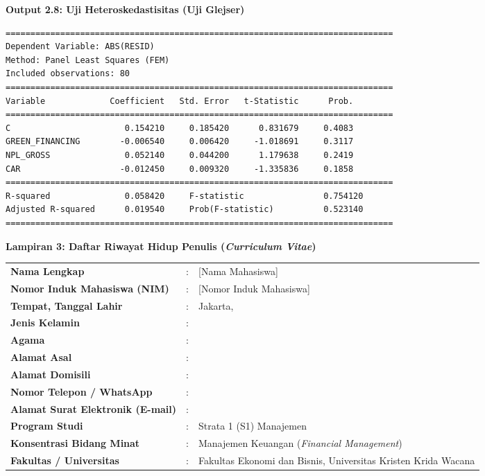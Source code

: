 \documentclass[12pt,a4paper]{article}
\newcommand{\nahamahasiswa}{[Nama Mahasiswa]}
\newcommand{\nim}{[Nomor Induk Mahasiswa]}
\numberwithin{equation}{section}
\begin{document}
\vspace{0.4cm}
\noindent \textbf{Output 2.8: Uji Heteroskedastisitas (Uji Glejser)}
\begin{verbatim}
==============================================================================
Dependent Variable: ABS(RESID)
Method: Panel Least Squares (FEM)
Included observations: 80
==============================================================================
Variable             Coefficient   Std. Error   t-Statistic      Prob.
==============================================================================
C                       0.154210     0.185420      0.831679     0.4083
GREEN_FINANCING        -0.006540     0.006420     -1.018691     0.3117
NPL_GROSS               0.052140     0.044200      1.179638     0.2419
CAR                    -0.012450     0.009320     -1.335836     0.1858
==============================================================================
R-squared               0.058420     F-statistic                0.754120
Adjusted R-squared      0.019540     Prob(F-statistic)          0.523140
==============================================================================
\end{verbatim}

\vspace{0.8cm}
\noindent \textbf{Lampiran 3: Daftar Riwayat Hidup Penulis (\emph{Curriculum Vitae})}

\vspace{0.4cm}
\noindent
\begin{tabular}{lll}
  \textbf{Nama Lengkap} & : & \nahamahasiswa \\
  \textbf{Nomor Induk Mahasiswa (NIM)} & : & \nim \\
  \textbf{Tempat, Tanggal Lahir} & : & Jakarta, \underline{\hspace{4cm}} \\
  \textbf{Jenis Kelamin} & : & \underline{\hspace{4cm}} \\
  \textbf{Agama} & : & \underline{\hspace{4cm}} \\
  \textbf{Alamat Asal} & : & \underline{\hspace{7cm}} \\
  \textbf{Alamat Domisili} & : & \underline{\hspace{7cm}} \\
  \textbf{Nomor Telepon / WhatsApp} & : & \underline{\hspace{5cm}} \\
  \textbf{Alamat Surat Elektronik (E-mail)} & : & \underline{\hspace{7cm}} \\
  \textbf{Program Studi} & : & Strata 1 (S1) Manajemen \\
  \textbf{Konsentrasi Bidang Minat} & : & Manajemen Keuangan (\emph{Financial Management}) \\
  \textbf{Fakultas / Universitas} & : & Fakultas Ekonomi dan Bisnis, Universitas Kristen Krida Wacana \\
\end{tabular}
\end{document}
